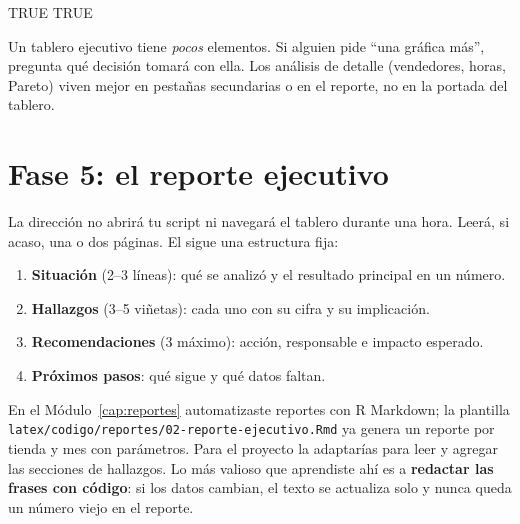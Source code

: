 \begin{rsalida}
[1] TRUE TRUE
\end{rsalida}

\begin{consejo}
Un tablero ejecutivo tiene \emph{pocos} elementos. Si alguien pide ``una
gráfica más'', pregunta qué decisión tomará con ella. Los análisis de
detalle (vendedores, horas, Pareto) viven mejor en pestañas secundarias o en
el reporte, no en la portada del tablero.
\end{consejo}

\section{Fase 5: el reporte ejecutivo}
\label{sec:m09-reporte}

La dirección no abrirá tu script ni navegará el tablero durante una hora.
Leerá, si acaso, una o dos páginas. El  sigue una
estructura fija:

\begin{enumerate}
  \item \textbf{Situación} (2--3 líneas): qué se analizó y el resultado
        principal en un número.
  \item \textbf{Hallazgos} (3--5 viñetas): cada uno con su cifra y su
        implicación.
  \item \textbf{Recomendaciones} (3 máximo): acción, responsable e impacto
        esperado.
  \item \textbf{Próximos pasos}: qué sigue y qué datos faltan.
\end{enumerate}

En el Módulo~\ref{cap:reportes} automatizaste reportes con R Markdown; la
plantilla \nolinkurl{latex/codigo/reportes/02-reporte-ejecutivo.Rmd} ya genera
un reporte por tienda y mes con parámetros. Para el proyecto la adaptarías
para leer  y agregar las
secciones de hallazgos. Lo más valioso que aprendiste ahí es a
\textbf{redactar las frases con código}: si los datos cambian, el texto se
actualiza solo y nunca queda un número viejo en el reporte.

